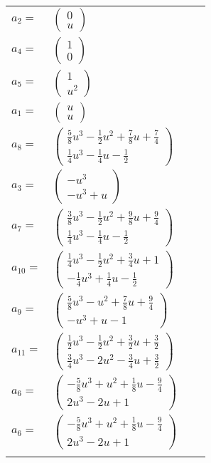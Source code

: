 \documentclass[1p]{elsarticle_modified}
\theoremstyle{definition}
\begin{document}
\begin{tabular}{m{7pt} m{180pt} m{7pt} m{180pt} }
\flushright $a_{2}=$&$\begin{pmatrix}0\\u\end{pmatrix}$ \\
\flushright $a_{4}=$&$\begin{pmatrix}1\\0\end{pmatrix}$ \\
\flushright $a_{5}=$&$\begin{pmatrix}1\\u^2\end{pmatrix}$ \\
\flushright $a_{1}=$&$\begin{pmatrix}u\\u\end{pmatrix}$ \\
\flushright $a_{8}=$&$\begin{pmatrix}\frac{5}{8} u^3-\frac{1}{2} u^2+\frac{7}{8} u+\frac{7}{4}\\\frac{1}{4} u^3-\frac{1}{4} u-\frac{1}{2}\end{pmatrix}$ \\
\flushright $a_{3}=$&$\begin{pmatrix}- u^3\\- u^3+u\end{pmatrix}$ \\
\flushright $a_{7}=$&$\begin{pmatrix}\frac{3}{8} u^3-\frac{1}{2} u^2+\frac{9}{8} u+\frac{9}{4}\\\frac{1}{4} u^3-\frac{1}{4} u-\frac{1}{2}\end{pmatrix}$ \\
\flushright $a_{10}=$&$\begin{pmatrix}\frac{1}{4} u^3-\frac{1}{2} u^2+\frac{3}{4} u+1\\-\frac{1}{4} u^3+\frac{1}{4} u-\frac{1}{2}\end{pmatrix}$ \\
\flushright $a_{9}=$&$\begin{pmatrix}\frac{5}{8} u^3- u^2+\frac{7}{8} u+\frac{9}{4}\\- u^3+u-1\end{pmatrix}$ \\
\flushright $a_{11}=$&$\begin{pmatrix}\frac{1}{2} u^3-\frac{1}{2} u^2+\frac{3}{2} u+\frac{3}{2}\\\frac{3}{4} u^3-2 u^2-\frac{3}{4} u+\frac{3}{2}\end{pmatrix}$ \\
\flushright $a_{6}=$&$\begin{pmatrix}-\frac{5}{8} u^3+u^2+\frac{1}{8} u-\frac{9}{4}\\2 u^3-2 u+1\end{pmatrix}$\\ \flushright $a_{6}=$&$\begin{pmatrix}-\frac{5}{8} u^3+u^2+\frac{1}{8} u-\frac{9}{4}\\2 u^3-2 u+1\end{pmatrix}$\\&\end{tabular}
\end{document}
